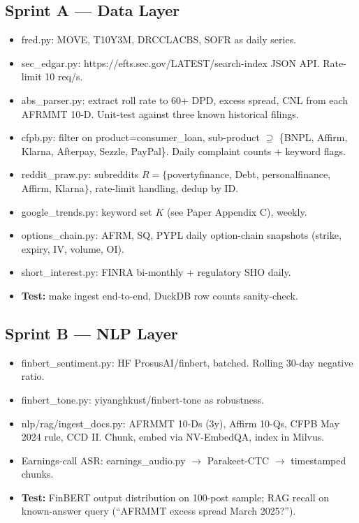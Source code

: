 \documentclass[11pt]{article}
\newcommand{\inlinecode}[1]{{\ttfamily\small #1}}
\begin{document}
\subsection{Sprint A --- Data Layer}
\begin{itemize}
  \item \inlinecode{fred.py}: MOVE, T10Y3M, DRCCLACBS, SOFR as daily series.
  \item \inlinecode{sec\_edgar.py}: \inlinecode{https://efts.sec.gov/LATEST/search-index} JSON API. Rate-limit 10 req/s.
  \item \inlinecode{abs\_parser.py}: extract roll rate to 60+ DPD, excess spread, CNL from each AFRMMT 10-D. Unit-test against three known historical filings.
  \item \inlinecode{cfpb.py}: filter on \inlinecode{product=consumer\_loan}, sub-product $\supseteq$ \{BNPL, Affirm, Klarna, Afterpay, Sezzle, PayPal\}. Daily complaint counts + keyword flags.
  \item \inlinecode{reddit\_praw.py}: subreddits $R = \{$povertyfinance, Debt, personalfinance, Affirm, Klarna$\}$, rate-limit handling, dedup by ID.
  \item \inlinecode{google\_trends.py}: keyword set $K$ (see Paper Appendix C), weekly.
  \item \inlinecode{options\_chain.py}: AFRM, SQ, PYPL daily option-chain snapshots (strike, expiry, IV, volume, OI).
  \item \inlinecode{short\_interest.py}: FINRA bi-monthly + regulatory SHO daily.
  \item \textbf{Test:} \inlinecode{make ingest} end-to-end, DuckDB row counts sanity-check.
\end{itemize}

\subsection{Sprint B --- NLP Layer}
\begin{itemize}
  \item \inlinecode{finbert\_sentiment.py}: HF \inlinecode{ProsusAI/finbert}, batched. Rolling 30-day negative ratio.
  \item \inlinecode{finbert\_tone.py}: \inlinecode{yiyanghkust/finbert-tone} as robustness.
  \item \inlinecode{nlp/rag/ingest\_docs.py}: AFRMMT 10-Ds (3y), Affirm 10-Qs, CFPB May 2024 rule, CCD II. Chunk, embed via NV-EmbedQA, index in Milvus.
  \item Earnings-call ASR: \inlinecode{earnings\_audio.py} $\to$ Parakeet-CTC $\to$ timestamped chunks.
  \item \textbf{Test:} FinBERT output distribution on 100-post sample; RAG recall on known-answer query (``AFRMMT excess spread March 2025?'').
\end{itemize}
\end{document}
